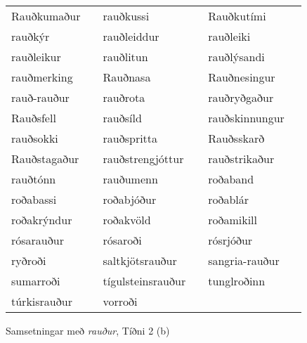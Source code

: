 \documentclass[../samsetningasafn.tex]{subfiles}
\begin{document}
\begin{wordlist}[H]
\begin{tcolorbox}

	\setlength{\extrarowheight}{3pt}
	\begin{tabular}{BlBlBl}		
		Rauðkumaður	&	\phantom{ba}	& 	
		rauðkussi		&	\phantom{ba}	& 		
		Rauðkutími		&	\phantom{ba}	\\ 		
		rauðkýr			&		& 		
		rauðleiddur		&		& 		
		rauðleiki			&		\\ 		
		rauðleikur		&		& 		
		rauðlitun			&		& 		
		rauðlýsandi		&		\\ 		
		rauðmerking		&		& 	
		Rauðnasa		&		& 		
		Rauðnesingur	&		\\ 	
		rauð-rauður		&		& 		
		rauðrota			&		& 		
		rauðryðgaður	&		\\ 	
		Rauðsfell		&		& 		
		rauðsíld			&		& 		
		rauðskinnungur	&		\\ 	
		rauðsokki		&		& 		
		rauðspritta		&		& 		
		Rauðsskarð		&		\\ 		
		Rauðstagaður	&		& 	
		rauðstrengjóttur	&		& 		
		rauðstrikaður		&		\\ 	
		rauðtónn		& 		& 	
		rauðumenn		&		& 		
		roðaband		&		\\ 	
		roðabassi		&		& 	
		roðabjóður		&		& 	
		roðablár			&		\\ 	
		roðakrýndur		&		& 	
		roðakvöld		&		& 	
		roðamikill		&		\\ 	
		rósarauður		&		& 	
		rósaroði			&		& 	
		rósrjóður		&		\\ 	
		ryðroði			&		& 		
		saltkjötsrauður	&		& 	
		sangria-rauður	&		\\ 	
		sumarroði		&		& 	
		tígulsteinsrauður	&		& 	
		tunglroðinn		&		\\ 		
		túrkisrauður		&		& 		
		vorroði			& 		& 		
						&
	\end{tabular}

\end{tcolorbox}
	\caption{Samsetningar með \textit{rauður}, Tíðni 2 (b)}
	\label{listi:rautt:2b}
\end{wordlist}	
\end{document}
